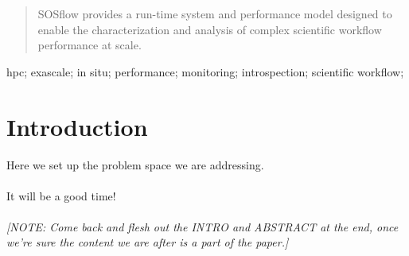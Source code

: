 \documentclass[10pt, conference, compsocconf]{IEEEtran}
\begin{document}




\maketitle


\begin{abstract}
SOSflow provides a run-time system and performance model designed to enable the 
characterization and analysis of complex scientific workflow performance at scale.


\end{abstract}

\begin{IEEEkeywords}
hpc; exascale; in situ; performance; monitoring; introspection; scientific 
workflow;

\end{IEEEkeywords}


%
\IEEEpeerreviewmaketitle


\section{Introduction}
Here we set up the problem space we are addressing.\\
\\
It will be a good time!\\
\\
\textit{[NOTE: Come back and flesh out the INTRO and ABSTRACT at the end, once 
we're sure the content we are after is a part of the paper.]}
\end{document}
